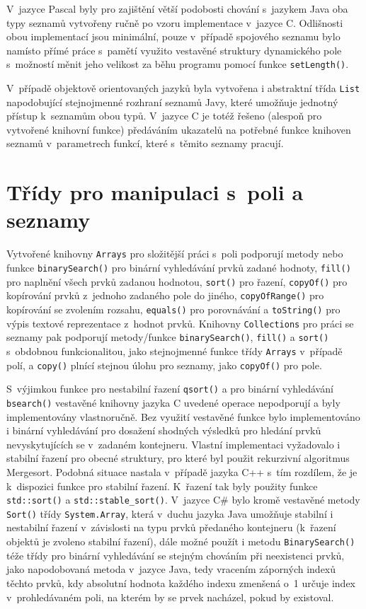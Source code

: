 \documentclass[czech,BP]{thesiskiv}
\begin{document}
V~jazyce Pascal byly pro zajištění větší podobosti chování s~jazykem Java oba typy seznamů vytvořeny ručně po vzoru implementace v~jazyce C. Odlišnosti obou implementací jsou minimální, pouze v~případě spojového seznamu bylo namísto přímé práce s~pamětí využito vestavěné struktury dynamického pole s~možností měnit jeho velikost za běhu programu pomocí funkce \texttt{setLength()}.\par
V~případě objektově orientovaných jazyků byla vytvořena i abstraktní třída \texttt{List} napodobující stejnojmenné rozhraní seznamů Javy, které umožňuje jednotný přístup k~seznamům obou typů. V~jazyce C je totéž řešeno (alespoň pro vytvořené knihovní funkce) předáváním ukazatelů na potřebné funkce knihoven seznamů v~parametrech funkcí, které s~těmito seznamy pracují.

\section{Třídy pro manipulaci s~poli a seznamy}
Vytvořené knihovny \texttt{Arrays} pro složitější práci s~poli podporují metody nebo funkce \texttt{binarySearch()} pro binární vyhledávání prvků zadané hodnoty, \texttt{fill()} pro naplnění všech prvků zadanou hodnotou, \texttt{sort()} pro řazení, \texttt{copyOf()} pro kopírování prvků z~jednoho zadaného pole do jiného, \texttt{copyOfRange()} pro kopírování se zvolením rozsahu, \texttt{equals()} pro porovnávání a \texttt{toString()} pro výpis textové reprezentace z~hodnot prvků. Knihovny \texttt{Collections} pro práci se seznamy pak podporují metody/funkce \texttt{binary\-Search()}, \texttt{fill()} a \texttt{sort()} s~obdobnou funkcionalitou, jako stejnojmenné funkce třídy \texttt{Arrays} v~případě polí, a \texttt{copy()} plnící stejnou úlohu pro seznamy, jako \texttt{copyOf()} pro pole.\par
S~výjimkou funkce pro nestabilní řazení \texttt{qsort()} a pro binární vyhledávání \texttt{bsearch()} vestavěné knihovny jazyka C uvedené operace nepodporují a byly implementovány vlastnoručně. Bez využití vestavěné funkce bylo implementováno i binární vyhledávání pro dosažení shodných výsledků pro hledání prvků nevyskytujících se v~zadaném kontejneru. Vlastní implementaci vyžadovalo i stabilní řazení pro obecné struktury, pro které byl použit rekurzivní algoritmus Mergesort.
Podobná situace nastala v~případě jazyka C++ s~tím rozdílem, že je k~dispozici funkce pro stabilní řazení. K~řazení tak byly použity funkce \texttt{std::sort()} a \texttt{std::stable\_sort()}.
V~jazyce C\# bylo kromě vestavěné metody \texttt{Sort()} třídy \texttt{System.Array}, která v~duchu jazyka Java umožňuje stabilní i nestabilní řazení v~závislosti na typu prvků předaného kontejneru (k~řazení objektů je zvoleno stabilní řazení), dále možné použít i metodu \texttt{BinarySearch()} téže třídy pro binární vyhledávání se stejným chováním při neexistenci prvků, jako napodobovaná metoda v~jazyce Java, tedy vracením záporných indexů těchto prvků, kdy absolutní hodnota každého indexu zmenšená o~1 určuje index v~prohledávaném poli, na kterém by se prvek nacházel, pokud by existoval.
\end{document}
